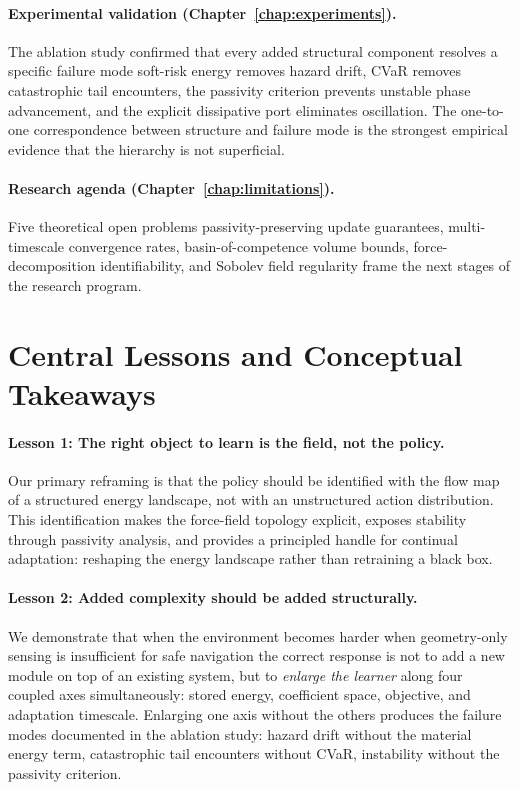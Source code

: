 \paragraph{Experimental validation (Chapter~\ref{chap:experiments}).}
The ablation study confirmed that every added structural component
resolves a specific failure mode soft-risk energy removes hazard
drift, CVaR removes catastrophic tail encounters, the passivity
criterion prevents unstable phase advancement, and the explicit
dissipative port eliminates oscillation.
The one-to-one correspondence between structure and failure mode is
the strongest empirical evidence that the hierarchy is not superficial.

\paragraph{Research agenda (Chapter~\ref{chap:limitations}).}
Five theoretical open problems passivity-preserving update guarantees,
multi-timescale convergence rates, basin-of-competence volume bounds,
force-decomposition identifiability, and Sobolev field regularity 
frame the next stages of the research program.

\section{Central Lessons and Conceptual Takeaways}
\label{sec:ch8:lessons}

\paragraph{Lesson 1: The right object to learn is the field, not the policy.}
Our primary reframing is that the policy should be identified
with the flow map of a structured energy landscape, not with an
unstructured action distribution.
This identification makes the force-field topology explicit, exposes
stability through passivity analysis, and provides a principled handle
for continual adaptation: reshaping the energy landscape rather than
retraining a black box.

\paragraph{Lesson 2: Added complexity should be added structurally.}
We demonstrate that when the environment becomes harder when
geometry-only sensing is insufficient for safe navigation the correct
response is not to add a new module on top of an existing system, but
to \emph{enlarge the learner} along four coupled axes simultaneously:
stored energy, coefficient space, objective, and adaptation timescale.
Enlarging one axis without the others produces the failure modes
documented in the ablation study: hazard drift without the material
energy term, catastrophic tail encounters without CVaR, instability
without the passivity criterion.

